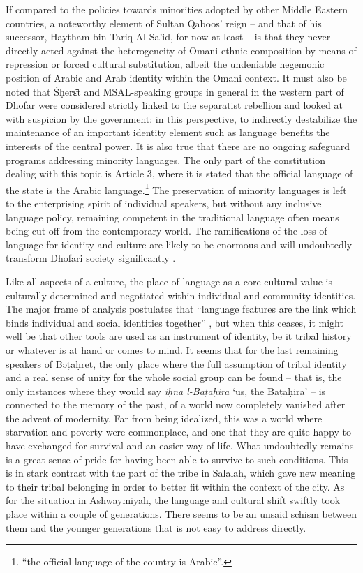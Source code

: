 \documentclass[output=paper]{langscibook}
\begin{document}
If compared to the policies towards minorities adopted by other Middle Eastern countries, a noteworthy element of Sultan Qaboos’ reign – and that of his successor, Haytham bin Tariq Al Sa'id, for now at least – is that they never directly acted against the heterogeneity of Omani ethnic composition by means of repression or forced cultural substitution, albeit the undeniable hegemonic position of Arabic and Arab identity within the Omani context. It must also be noted that Śḥerɛ̄t and MSAL-speaking groups in general in the western part of Dhofar were considered strictly linked to the separatist rebellion and looked at with suspicion by the government: in this perspective, to indirectly destabilize the maintenance of an important identity element such as language benefits the interests of the central power. It is also true that there are no ongoing safeguard programs addressing minority languages. The only part of the constitution dealing with this topic is Article 3, where it is stated that the official language of the state is the Arabic language.\footnote{ “the official language of the country is Arabic”.} The preservation of minority languages is left to the enterprising spirit of individual speakers, but without any inclusive language policy, remaining competent in the traditional language often means being cut off from the contemporary world. The ramifications of the loss of language for identity and culture are likely to be enormous and will undoubtedly transform Dhofari society significantly \citep[260]{peterson_omans_2004}.

Like all aspects of a culture, the place of language as a core cultural value is culturally determined \citep{smolicz_language_1980} and negotiated within individual and community identities. The major frame of analysis postulates that “language features are the link which binds individual and social identities together” \citep[317]{tabouret-keller_language_2017}, but when this ceases, it might well be that other tools are used as an instrument of identity, be it tribal history or whatever is at hand or comes to mind. It seems that for the last remaining speakers of Bəṭaḥrēt, the only place where the full assumption of tribal identity and a real sense of unity for the whole social group can be found – that is, the only instances where they would say \textit{iḥna l-Baṭāḥira} ‘us, the Baṭāḥira’ – is connected to the memory of the past, of a world now completely vanished after the advent of modernity. Far from being idealized, this was a world where starvation and poverty were commonplace, and one that they are quite happy to have exchanged for survival and an easier way of life. What undoubtedly remains is a great sense of pride for having been able to survive to such conditions. This is in stark contrast with the part of the tribe in Salalah, which gave new meaning to their tribal belonging in order to better fit within the context of the city. As for the situation in Ashwaymiyah, the language and cultural shift swiftly took place within a couple of generations. There seems to be an unsaid schism between them and the younger generations that is not easy to address directly.
\end{document}
